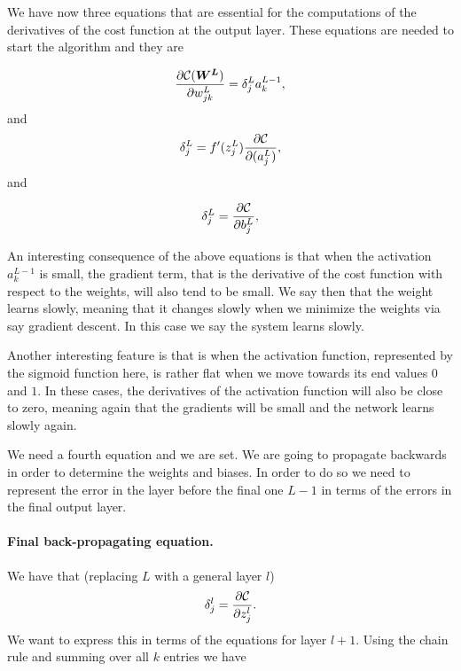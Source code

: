\documentclass[%
oneside,                 %
final,                   %
10pt]{article}
\newenvironment{block_mdfboxadmon}[1][]{
\begin{block_mdfboxmdframed}[frametitle=#1]
}
{
\end{block_mdfboxmdframed}
}
\begin{document}

We have now three equations that are essential for the computations of the derivatives of the cost function at the output layer. These equations are needed to start the algorithm and they are


\begin{block_mdfboxadmon}

\begin{equation}
\frac{\partial{\cal C}(\boldsymbol{W^L})}{\partial w_{jk}^L}  =  \delta_j^La_k^{L-1},
\end{equation}
and
\begin{equation}
\delta_j^L = f'(z_j^L)\frac{\partial {\cal C}}{\partial (a_j^L)},
\end{equation}
and

\begin{equation}
\delta_j^L = \frac{\partial {\cal C}}{\partial b_j^L},
\end{equation}
\end{block_mdfboxadmon} %




An interesting consequence of the above equations is that when the
activation $a_k^{L-1}$ is small, the gradient term, that is the
derivative of the cost function with respect to the weights, will also
tend to be small. We say then that the weight learns slowly, meaning
that it changes slowly when we minimize the weights via say gradient
descent. In this case we say the system learns slowly.

Another interesting feature is that is when the activation function,
represented by the sigmoid function here, is rather flat when we move towards
its end values $0$ and $1$. In these
cases, the derivatives of the activation function will also be close
to zero, meaning again that the gradients will be small and the
network learns slowly again.



We need a fourth equation and we are set. We are going to propagate
backwards in order to determine the weights and biases. In order
to do so we need to represent the error in the layer before the final
one $L-1$ in terms of the errors in the final output layer.

\paragraph{Final back-propagating equation.}
We have that (replacing $L$ with a general layer $l$)
\[
\delta_j^l =\frac{\partial {\cal C}}{\partial z_j^l}.
\]
We want to express this in terms of the equations for layer $l+1$. Using the chain rule and summing over all $k$ entries we have
\end{document}
